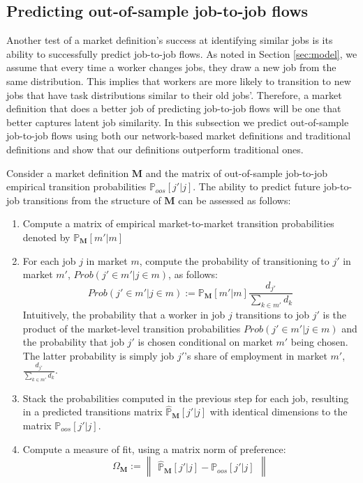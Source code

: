 \documentclass[12pt]{article}
\theoremstyle{definition}
\theoremstyle{plain}
\begin{document}
\subsection{Predicting out-of-sample job-to-job flows}

Another test of a market definition's success at identifying similar jobs is its ability to successfully predict job-to-job flows. As noted in Section \ref{sec:model}, we assume that every time a worker changes jobs, they draw a new job from the same distribution. This implies that workers are more likely to transition to new jobs that have task distributions similar to their old jobs'.  Therefore, a market definition that does a better job of predicting job-to-job flows will be one that better captures latent job similarity. In this subsection we predict out-of-sample job-to-job flows using both our network-based market definitions and traditional definitions and show that our definitions outperform traditional ones.


Consider a market definition $\mathbf{M}$ and the matrix of out-of-sample job-to-job empirical transition probabilities $\mathbb{P}_{oos}[j'|j]$. The ability to predict future job-to-job transitions from the structure of $\mathbf{M}$ can be assessed as follows:

\begin{enumerate}
	\item Compute a matrix of empirical market-to-market transition probabilities denoted by $\mathbb{P}_{\mathbf{M}}[m'|m]$
	\item For each job $j$ in market $m$, compute the probability of transitioning to $j'$ in market $m'$, $Prob(j' \in m'|j \in m)$, as follows:
	\[Prob(j' \in m'|j \in m) := \mathbb{P}_{\mathbf{M}}[m'|m] \frac{d_{j'}}{\sum_{k\in m'} d_{k}} \]
	Intuitively, the probability that a worker in job $j$ transitions to job $j'$ is the product of the market-level transition probabilities $Prob(j' \in m'|j \in m)$ and the probability that job $j'$ is chosen conditional on market $m'$ being chosen. The latter probability is simply job $j'$'s share of employment in market $m'$, $ \frac{d_{j'}}{\sum_{k\in m'} d_{k}}$.
	\item Stack the probabilities computed in the previous step for each job, resulting in a predicted transitions matrix $\mathbb{\hat P}_{\mathbf{M}}[j'|j]$ with identical dimensions to the matrix $\mathbb{P}_{oos}[j'|j]$.
	\item Compute a measure of fit, using a matrix norm of preference:
	\[ \Omega_{\mathbf{M}} := \begin{Vmatrix}
		\mathbb{\hat P}_{\mathbf{M}}[j'|j] - \mathbb{P}_{oos}[j'|j]
	\end{Vmatrix} \]
\end{enumerate}
\end{document}
